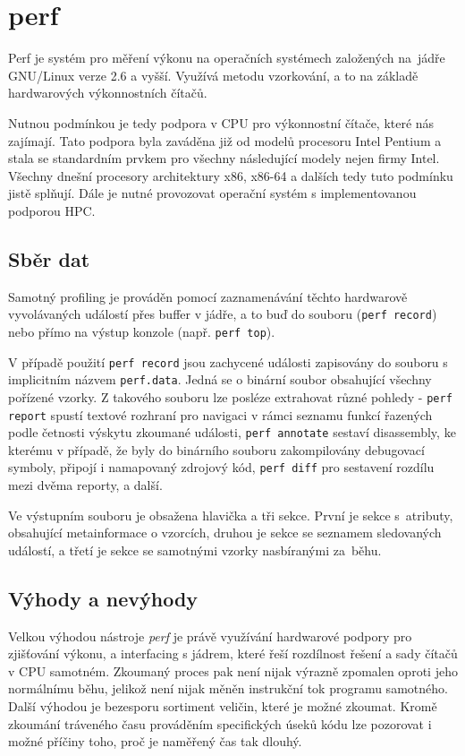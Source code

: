 \documentclass[czech,BP]{thesiskiv}
\begin{document}
\section{perf}\label{subsec:perf}

Perf je systém pro měření výkonu na operačních systémech založených na~jádře GNU/Linux verze 2.6 a vyšší. Využívá metodu vzorkování, a to na základě hardwarových výkonnostních čítačů.

Nutnou podmínkou je tedy podpora v CPU pro výkonnostní čítače, které nás zajímají. Tato podpora byla zaváděna již od modelů procesoru Intel Pentium\cite{perf3} a stala se standardním prvkem pro všechny následující modely nejen firmy Intel. Všechny dnešní procesory architektury x86, x86-64 a dalších tedy tuto podmínku jistě splňují. Dále je nutné provozovat operační systém s implementovanou podporou HPC.

\subsection*{Sběr dat}\label{subsubsec:perf-collect}

Samotný profiling je prováděn pomocí zaznamenávání těchto hardwarově vyvolávaných událostí přes buffer v jádře, a to buď do souboru (\texttt{perf record}) nebo přímo na výstup konzole (např. \texttt{perf top}).

V případě použití \texttt{perf record} jsou zachycené události zapisovány do souboru s implicitním názvem \texttt{perf.data}. Jedná se o binární soubor obsahující všechny pořízené vzorky. Z takového souboru lze posléze extrahovat různé pohledy - \texttt{perf report} spustí textové rozhraní pro navigaci v rámci seznamu funkcí řazených podle četnosti výskytu zkoumané události, \texttt{perf annotate} sestaví disassembly, ke kterému v případě, že byly do binárního souboru zakompilovány debugovací symboly, připojí i namapovaný zdrojový kód, \texttt{perf diff} pro sestavení rozdílu mezi dvěma reporty, a další.

Ve výstupním souboru je obsažena hlavička a tři sekce. První je sekce s~atributy, obsahující metainformace o vzorcích, druhou je sekce se seznamem sledovaných událostí, a třetí je sekce se samotnými vzorky nasbíranými za~běhu\cite{perf2}.

\subsection*{Výhody a nevýhody}

Velkou výhodou nástroje \emph{perf} je právě využívání hardwarové podpory pro zjišťování výkonu, a interfacing s jádrem, které řeší rozdílnost řešení a sady čítačů v CPU samotném. Zkoumaný proces pak není nijak výrazně zpomalen oproti jeho normálnímu běhu, jelikož není nijak měněn instrukční tok programu samotného. Další výhodou je bezesporu sortiment veličin, které je možné zkoumat. Kromě  zkoumání tráveného času prováděním specifických úseků kódu lze pozorovat i možné příčiny toho, proč je naměřený čas tak dlouhý.
\end{document}
